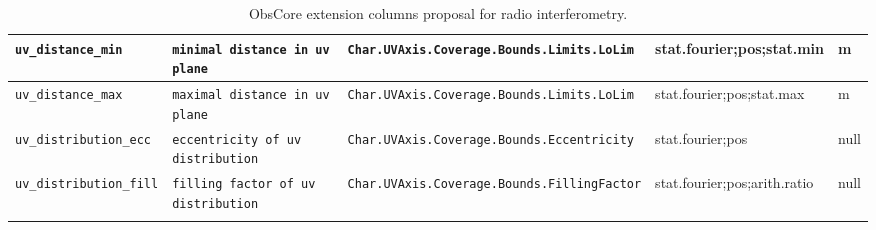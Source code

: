 \documentclass[11pt,a4paper]{ivoa}
\begin{document}
\begin{landscape}
\begin{longtable}{l p{4.5cm}| p{4cm}| l l |}
\texttt{uv\_distance\_min}&\texttt{minimal distance in uv plane}&\texttt{Char.UVAxis.Coverage\newline .Bounds.Limits.LoLim}&stat.fourier;pos;stat.min&m \\
\hline
\texttt{uv\_distance\_max}&\texttt{maximal distance in uv plane}&\texttt{Char.UVAxis.Coverage\newline .Bounds.Limits.LoLim}&stat.fourier;pos;stat.max&m \\
\hline
\texttt{uv\_distribution\_ecc}&\texttt{eccentricity of uv distribution}&\texttt{Char.UVAxis.Coverage\newline .Bounds.Eccentricity}&stat.fourier;pos& null \\
\hline
\texttt{uv\_distribution\_fill}&\texttt{filling factor of uv distribution}&\texttt{Char.UVAxis.Coverage\newline .Bounds.FillingFactor}&stat.fourier;pos;\newline arith.ratio& null \\
\hline
\caption{ObsCore extension columns proposal for radio interferometry.}
\label{tab:ExtensionAtt_interferometry}
\end{longtable}
\end{landscape}
\end{document}
